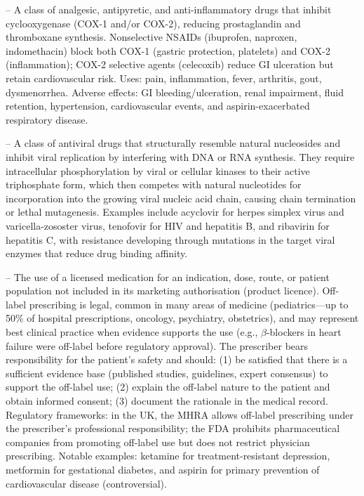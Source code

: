 -- A class of analgesic, antipyretic, and anti-inflammatory drugs that inhibit cyclooxygenase (COX-1 and/or COX-2), reducing prostaglandin and thromboxane synthesis. Nonselective NSAIDs (ibuprofen, naproxen, indomethacin) block both COX-1 (gastric protection, platelets) and COX-2 (inflammation); COX-2 selective agents (celecoxib) reduce GI ulceration but retain cardiovascular risk. Uses: pain, inflammation, fever, arthritis, gout, dysmenorrhea. Adverse effects: GI bleeding/ulceration, renal impairment, fluid retention, hypertension, cardiovascular events, and aspirin-exacerbated respiratory disease.

-- A class of antiviral drugs that structurally resemble natural nucleosides and inhibit viral replication by interfering with DNA or RNA synthesis. They require intracellular phosphorylation by viral or cellular kinases to their active triphosphate form, which then competes with natural nucleotides for incorporation into the growing viral nucleic acid chain, causing chain termination or lethal mutagenesis. Examples include acyclovir for herpes simplex virus and varicella-zososter virus, tenofovir for HIV and hepatitis B, and ribavirin for hepatitis C, with resistance developing through mutations in the target viral enzymes that reduce drug binding affinity.

-- The use of a licensed medication for an indication, dose, route, or patient population not included in its marketing authorisation (product licence). Off-label prescribing is legal, common in many areas of medicine (pediatrics—up to 50\% of hospital prescriptions, oncology, psychiatry, obstetrics), and may represent best clinical practice when evidence supports the use (e.g., $\beta$-blockers in heart failure were off-label before regulatory approval). The prescriber bears responsibility for the patient's safety and should: (1) be satisfied that there is a sufficient evidence base (published studies, guidelines, expert consensus) to support the off-label use; (2) explain the off-label nature to the patient and obtain informed consent; (3) document the rationale in the medical record. Regulatory frameworks: in the UK, the MHRA allows off-label prescribing under the prescriber's professional responsibility; the FDA prohibits pharmaceutical companies from promoting off-label use but does not restrict physician prescribing. Notable examples: ketamine for treatment-resistant depression, metformin for gestational diabetes, and aspirin for primary prevention of cardiovascular disease (controversial).

